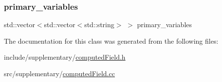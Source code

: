 \subsubsection{\texorpdfstring{primary\+\_\+variables}{primary\_variables}}
{\footnotesize\ttfamily std\+::vector$<$std\+::vector$<$std\+::string$>$ $>$ primary\+\_\+variables}



The documentation for this class was generated from the following files\+:\begin{DoxyCompactItemize}
\item 
include/supplementary/\mbox{\hyperlink{computed_field_8h}{computed\+Field.\+h}}\item 
src/supplementary/\mbox{\hyperlink{computed_field_8cc}{computed\+Field.\+cc}}\end{DoxyCompactItemize}
